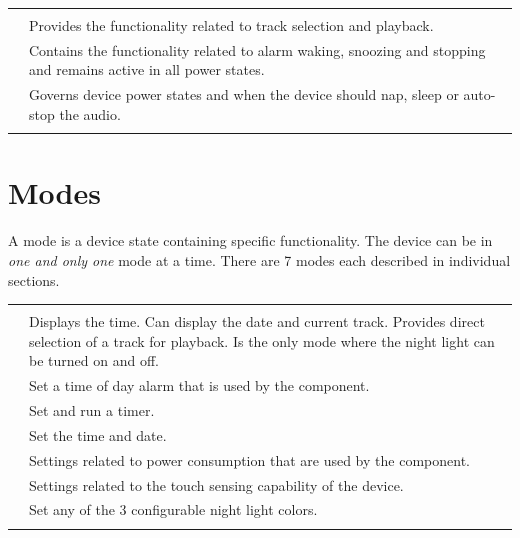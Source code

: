 \begin{table}[H]
\centering
\begin{tabu}{ X[1,c,m] | X[3,l,m] }
  \thrule
   &  \\ \mrule

  \hyperref[Audio]{}
    & Provides the functionality related to track selection and
      playback. \\ 
  \hyperref[Alarm]{}
    & Contains the functionality related to alarm waking, snoozing and stopping
      and remains active in all power states. \\ 
  \hyperref[Power]{}
    & Governs device power states and when the device should nap, sleep or
      auto-stop the audio. \\
  \bhrule
\end{tabu}
\end{table}

\section{Modes}

A mode is a device state containing specific functionality.  The device can be
in \textit{one and only one} mode at a time.  There are \num{7} modes each
described in individual sections.

\begin{table}[H]
\centering
\begin{tabu}{ X[1,c,m] | X[3,l,m] }
  \thrule
   &  \\ \mrule

  \hyperref[Clock]{}
    & Displays the time. Can display the date and current track.
    Provides direct selection of a track for playback. Is the only mode
    where the night light can be turned on and off. \\ 
  \hyperref[Set Alarm]{} & Set a time of day alarm that is used by
    the \hyperref[Alarm]{} component. \\ 
  \hyperref[Timer]{} & Set and run a timer. \\ 
  \hyperref[Set Clock]{} & Set the time and date. \\ 
  \hyperref[Power Settings]{} & Settings related to power consumption
    that are used by the \hyperref[Power]{} component. \\ 
  \hyperref[Touch Settings]{} & Settings related to the touch sensing
    capability of the device. \\ 
  \hyperref[Set Night Light]{} & Set any of the \num{3} configurable
    night light colors. \\

  \bhrule
\end{tabu}
\end{table}

